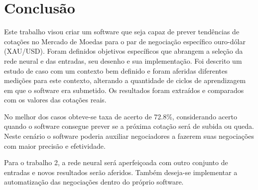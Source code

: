 \chapter[Conclusão]{Conclusão}

Este trabalho visou criar um software que seja capaz de prever tendências de cotações no Mercado de Moedas para o par de negociação
específico ouro-dólar (XAU/USD). Foram definidos objetivos específicos que abrangem a seleção da rede neural e das entradas, seu desenho
e sua implementação. Foi descrito um estudo de caso com um contexto bem definido e foram aferidas diferentes medições para este contexto,
alterando a quantidade de ciclos de aprendizagem em que o software era submetido. Os resultados foram extraídos e comparados com os valores
das cotações reais.

No melhor dos casos obteve-se taxa de acerto de 72.8\%, considerando acerto quando o software consegue prever se a próxima cotação será
de subida ou queda. Neste cenário o software poderia auxiliar negociadores a fazerem suas negociações com maior precisão e efetividade.

Para o trabalho 2, a rede neural será aperfeiçoada com outro conjunto de entradas e novos resultados serão aferidos. Também deseja-se
implementar a automatização das negociações dentro do próprio software.
